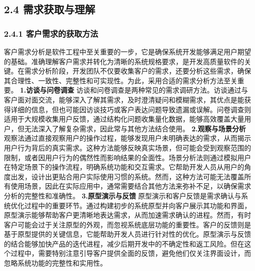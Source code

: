 \subsection{2.4 需求获取与理解}\label{ux9700ux6c42ux83b7ux53d6ux4e0eux7406ux89e3} \subsubsection{2.4.1
客户需求的获取方法}\label{ux5ba2ux6237ux9700ux6c42ux7684ux83b7ux53d6ux65b9ux6cd5}
客户需求分析是软件工程中至关重要的一步，它是确保系统开发能够满足用户期望的基础。准确理解客户需求并转化为清晰的系统规格要求，是开发高质量软件的关键。在需求分析阶段，开发团队不仅要收集客户的需求，还要分析这些需求，确保其合理性、一致性、完整性和可实现性。为此，采用合适的需求分析方法至关重要。
\textbf{1.访谈与问卷调查}
访谈和问卷调查是两种常见的需求调研方法。访谈通过与客户面对面交流，能够深入了解其需求，及时澄清疑问和模糊需求，其优点是能获得详细的信息，但也可能因访谈技巧或客户表达问题导致遗漏或误解。问卷调查则适用于大规模收集用户反馈，通过结构化问题收集量化数据，能够高效覆盖大量用户，但无法深入了解复杂需求，因此常与其他方法结合使用。
\textbf{2.观察与场景分析}
观察法通过直接观察用户的操作过程，能够发现用户未明确表达的需求，从而揭示用户行为背后的真实需求。这种方法能够反映真实场景，但可能会受到观察范围的限制，或者因用户行为的偶然性而影响结果的全面性。场景分析法则通过模拟用户在特定场景下的操作流程，明确系统功能和交互需求。它帮助开发人员从用户的角度出发，设计出更贴合用户实际使用习惯的系统。然而，这种方法可能无法覆盖所有使用场景，因此在实际应用中，通常需要结合其他方法来弥补不足，以确保需求分析的完整性和准确性。
\textbf{3.原型演示与反馈}
原型演示和客户反馈是需求确认与系统优化过程中的重要环节。通过构建初步的系统原型并向客户展示其功能和界面，原型演示能够帮助客户更清晰地表达需求，从而加速需求确认的进程。然而，有时客户可能会过于关注原型的外观，而忽视系统底层功能的重要性。客户的反馈则是基于原型提供的关键信息，它能帮助开发人员进行针对性的优化。原型演示与反馈的结合能够加快产品的迭代进程，减少后期开发中的不确定性和返工风险。但在这个过程中，需要特别注意引导客户提供全面的反馈，避免他们仅关注界面设计，而忽略系统功能的完整性和实用性。
